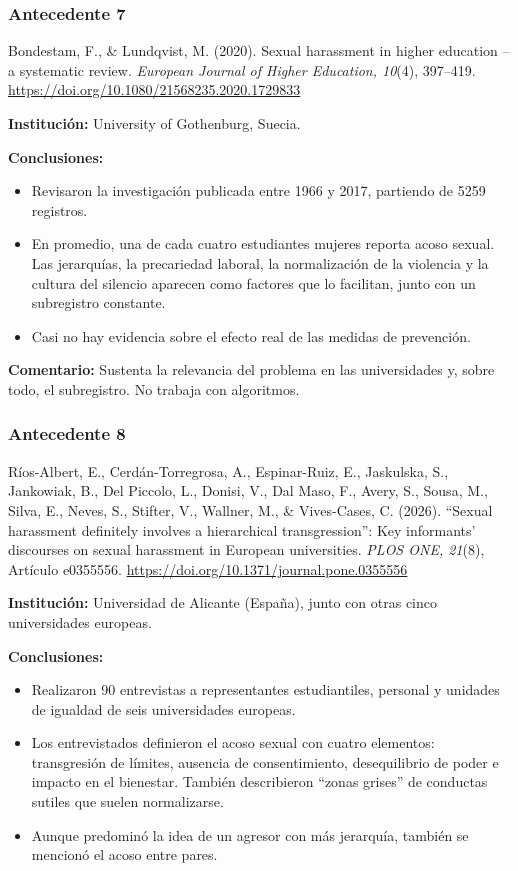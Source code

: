 \subsubsection{Antecedente 7}
\noindent Bondestam, F., \& Lundqvist, M. (2020). Sexual harassment in higher education -- a systematic review. \textit{European Journal of Higher Education, 10}(4), 397--419. \url{https://doi.org/10.1080/21568235.2020.1729833}

\noindent\textbf{Institución:} University of Gothenburg, Suecia.

\noindent\textbf{Conclusiones:}
\begin{itemize}
	\item Revisaron la investigación publicada entre 1966 y 2017, partiendo de 5259 registros.
	\item En promedio, una de cada cuatro estudiantes mujeres reporta acoso sexual. Las jerarquías, la precariedad laboral, la normalización de la violencia y la cultura del silencio aparecen como factores que lo facilitan, junto con un subregistro constante.
	\item Casi no hay evidencia sobre el efecto real de las medidas de prevención.
\end{itemize}

\noindent\textbf{Comentario:} Sustenta la relevancia del problema en las universidades y, sobre todo, el subregistro. No trabaja con algoritmos.

\subsubsection{Antecedente 8}
\noindent Ríos-Albert, E., Cerdán-Torregrosa, A., Espinar-Ruiz, E., Jaskulska, S., Jankowiak, B., Del Piccolo, L., Donisi, V., Dal Maso, F., Avery, S., Sousa, M., Silva, E., Neves, S., Stifter, V., Wallner, M., \& Vives-Cases, C. (2026). \enquote{Sexual harassment definitely involves a hierarchical transgression}: Key informants' discourses on sexual harassment in European universities. \textit{PLOS ONE, 21}(8), Artículo e0355556. \url{https://doi.org/10.1371/journal.pone.0355556}

\noindent\textbf{Institución:} Universidad de Alicante (España), junto con otras cinco universidades europeas.

\noindent\textbf{Conclusiones:}
\begin{itemize}
	\item Realizaron 90 entrevistas a representantes estudiantiles, personal y unidades de igualdad de seis universidades europeas.
	\item Los entrevistados definieron el acoso sexual con cuatro elementos: transgresión de límites, ausencia de consentimiento, desequilibrio de poder e impacto en el bienestar. También describieron \enquote{zonas grises} de conductas sutiles que suelen normalizarse.
	\item Aunque predominó la idea de un agresor con más jerarquía, también se mencionó el acoso entre pares.
\end{itemize}

